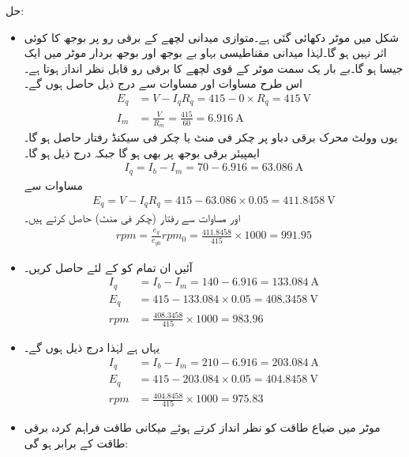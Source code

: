 حل:
\begin{itemize}
\item
شکل  میں موٹر دکھائی گئی ہے۔متوازی میدانی لچھے کے برقی رو پر بوجھ کا کوئی اثر نہیں ہو گا۔لہٰذا میدانی مقناطیسی بہاو بے بوجھ اور بوجھ بردار موٹر میں ایک جیسا ہو گا۔بے بار یک سمت  موٹر کے قوی لچھے کا برقی رو   قابل نظر انداز ہوتا ہے۔اس طرح مساوات   اور مساوات   سے  درج ذیل حاصل ہوں گے۔
\begin{align*}
E_q&=V-I_q R_q=415-0\times R_q=\SI{415}{\volt}\\
I_m&=\frac{V}{R_m}=\frac{415}{60}=\SI{6.916}{\ampere}
\end{align*}
یوں  وولٹ محرک برقی دباو پر   چکر فی منٹ یا  چکر فی سیکنڈ رفتار حاصل ہو گا۔ ایمپیئر برقی بوجھ پر بھی  ہو گا جبکہ   درج ذیل ہو گا۔
\begin{align*}
I_q=I_b-I_m=70-6.916=\SI{63.086}{\ampere}
\end{align*}
 مساوات   سے 
\begin{align*}
E_q=V-I_q R_q=415-63.086 \times 0.05=\SI{411.8458}{\volt}
\end{align*}
اور مساوات   سے رفتار (چکر فی منٹ) حاصل کرتے ہیں۔
\begin{align*}
rpm=\frac{e_q}{e_{q0}} rpm_0=\frac{411.8458}{415} \times 1000=991.95
\end{align*}
%
\item
آئیں ان تمام کو   کے لئے حاصل کریں۔
\begin{align*}
I_q&=I_b-I_m=140-6.916=\SI{133.084}{\ampere}\\
E_q&=415-133.084 \times 0.05=\SI{408.3458}{\volt}\\
rpm&=\frac{408.3458}{415} \times 1000=983.96
\end{align*}
%
\item
یہاں  ہے لہٰذا درج ذیل ہوں گے۔
\begin{align*}
I_q&=I_b-I_m=210-6.916=\SI{203.084}{\ampere}\\
E_q&=415-203.084 \times 0.05=\SI{404.8458}{\volt}\\
rpm&=\frac{404.8458}{415} \times 1000=975.83
\end{align*}
%
\item
موٹر میں ضیاع طاقت  کو نظر انداز کرتے ہوئے میکانی طاقت فراہم کردہ برقی طاقت کے برابر ہو گی:

\end{itemize}
